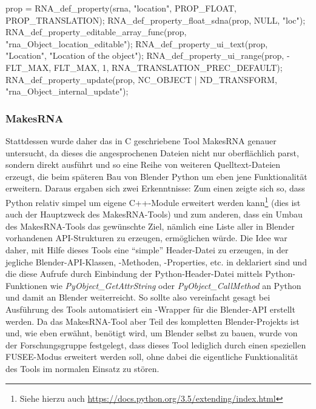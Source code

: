 \begin{code}[caption={Deklaration der Property \protect\emph{location} der Klasse \protect\emph{Object} in \protect\emph{rna\_object.c}},label={lst:locdecl}]
	prop = RNA_def_property(srna, "location", PROP_FLOAT, PROP_TRANSLATION);
	RNA_def_property_float_sdna(prop, NULL, "loc");
	RNA_def_property_editable_array_func(prop, "rna_Object_location_editable");
	RNA_def_property_ui_text(prop, "Location", "Location of the object");
	RNA_def_property_ui_range(prop, -FLT_MAX, FLT_MAX, 1, RNA_TRANSLATION_PREC_DEFAULT);
	RNA_def_property_update(prop, NC_OBJECT | ND_TRANSFORM, "rna_Object_internal_update");
\end{code}

\subsubsection{MakesRNA}

Stattdessen wurde daher das in C geschriebene Tool MakesRNA genauer untersucht, da dieses die angesprochenen Dateien nicht nur oberflächlich parst, sondern direkt ausführt und so eine Reihe von weiteren Quelltext-Dateien erzeugt, die beim späteren Bau von Blender Python um eben jene Funktionalität erweitern. Daraus ergaben sich zwei Erkenntnisse: Zum einen zeigte sich so, dass Python relativ simpel um eigene C++-Module erweitert werden kann\footnote{Siehe hierzu auch \url{https://docs.python.org/3.5/extending/index.html}} (dies ist auch der Hauptzweck des MakesRNA-Tools) und zum anderen, dass ein Umbau des MakesRNA-Tools das gewünschte Ziel, nämlich eine Liste aller in Blender vorhandenen API-Strukturen zu erzeugen, ermöglichen würde. Die Idee war daher, mit Hilfe dieses Tools eine \enquote{simple} Header-Datei zu erzeugen, in der jegliche Blender-API-Klassen, -Methoden, -Properties, etc. in \CC{} deklariert sind und die diese Aufrufe durch Einbindung der Python-Header-Datei mittels Python-Funktionen wie \emph{PyObject\_GetAttrString} oder \emph{PyObject\_CallMethod} an Python und damit an Blender weiterreicht. So sollte also vereinfacht gesagt bei Ausführung des Tools automatisiert ein \CC{}-Wrapper für die Blender-API erstellt werden. Da das MakesRNA-Tool aber Teil des kompletten Blender-Projekts ist und, wie eben erwähnt, benötigt wird, um Blender selbst zu bauen, wurde von der Forschungsgruppe festgelegt, dass dieses Tool lediglich durch einen speziellen FUSEE-Modus erweitert werden soll, ohne dabei die eigentliche Funktionalität des Tools im normalen Einsatz zu stören. 

